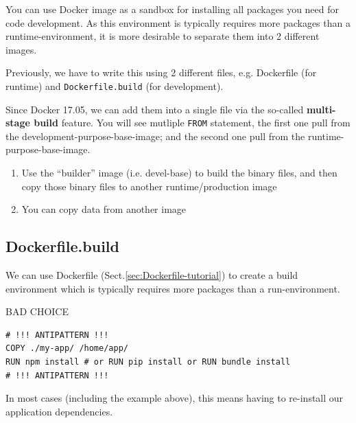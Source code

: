 You can use Docker image as a sandbox for installing all packages you need for
code development.
As this environment is typically requires more packages than a
runtime-environment, it is more desirable to separate them into 2 different
images.

Previously, we have to write this using 2 different files, e.g. Dockerfile (for runtime) and 
\verb!Dockerfile.build! (for development).

Since Docker 17.05, we can add them into a single file via the so-called {\bf
multi-stage build} feature. You will see mutliple \verb!FROM! statement, the
first one pull from the development-purpose-base-image; and the second one pull
from the runtime-purpose-base-image.

\begin{enumerate}
  
  \item Use the ``builder'' image (i.e. devel-base) to build the binary files,
  and then copy those binary files to another runtime/production image
  
  \item You can copy data from another image
\end{enumerate}

\subsection{Dockerfile.build }

We can use Dockerfile (Sect.\ref{sec:Dockerfile-tutorial}) to create a build environment which is typically requires
more packages than a run-environment.

BAD CHOICE
\begin{verbatim}
# !!! ANTIPATTERN !!!
COPY ./my-app/ /home/app/
RUN npm install # or RUN pip install or RUN bundle install
# !!! ANTIPATTERN !!!
\end{verbatim}

In most cases (including the example above), this means having to re-install our
application dependencies.

